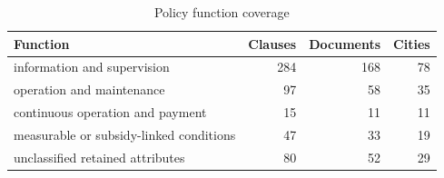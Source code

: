 \begin{table}[htbp]\centering\small
\caption{Policy function coverage}\label{tab:si_policy_landscape}
\begin{tabular}{@{}p{.57\linewidth}rrr@{}}
\toprule
Function & Clauses & Documents & Cities \\\midrule
information and supervision & 284 & 168 & 78 \\
operation and maintenance & 97 & 58 & 35 \\
continuous operation and payment & 15 & 11 & 11 \\
measurable or subsidy-linked conditions & 47 & 33 & 19 \\
unclassified retained attributes & 80 & 52 & 29 \\
\bottomrule\end{tabular}
\end{table}

